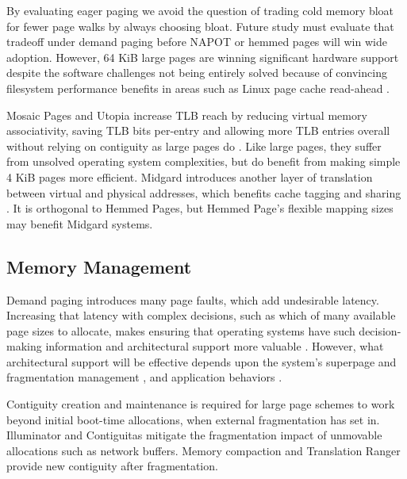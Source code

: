 By evaluating eager paging we avoid the question of trading cold memory bloat for fewer page walks by always choosing bloat. Future study must evaluate that tradeoff under demand paging before NAPOT or hemmed pages will win wide adoption. However, 64 KiB large pages are winning significant hardware support despite the software challenges not being entirely solved \cite{talluri_surpassing_1994, sites_larger_2022, psomadakis_transparent_2023} because of convincing filesystem performance benefits in areas such as Linux page cache read-ahead \cite{wilcox_large_2020}.

Mosaic Pages and Utopia increase TLB reach by reducing virtual memory associativity, saving TLB bits per-entry and allowing more TLB entries overall without relying on contiguity as large pages do \cite{gosakan_mosaic_2023, kanellopoulos_utopia_2023}. Like large pages, they suffer from unsolved operating system complexities, but do benefit from making simple 4 KiB pages more efficient. Midgard introduces another layer of translation between virtual and physical addresses, which benefits cache tagging and sharing \cite{gupta_rebooting_2021}. It is orthogonal to Hemmed Pages, but Hemmed Page's flexible mapping sizes may benefit Midgard systems.

\subsection{Memory Management}

Demand paging introduces many page faults, which add undesirable latency. Increasing that latency with complex decisions, such as which of many available page sizes to allocate, makes ensuring that operating systems have such decision-making information and architectural support more valuable \cite{lee_case_2020, tirumalasetty_reducing_2022, manocha_architectural_2023}. However, what architectural support will be effective depends upon the system's superpage and fragmentation management \cite{kwon_coordinated_2016, panwar_making_2018, panwar_hawkeye_2019, zhu_comprehensive_2020, zhou_impact_2023, yan_nimble_2019}, and application behaviors \cite{hunter_beyond_2021, alverti_daxvm_2022, manocha_implications_2022}.

Contiguity creation and maintenance is required for large page schemes to work beyond initial boot-time allocations, when external fragmentation has set in. Illuminator \cite{panwar_making_2018} and Contiguitas \cite{zhao_contiguitas_2023} mitigate the fragmentation impact of unmovable allocations such as network buffers. Memory compaction \cite{corbet_memory_2010} and Translation Ranger \cite{yan_translation_2019} provide new contiguity after fragmentation.

